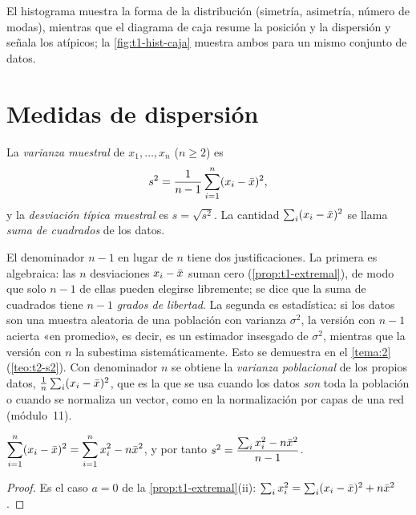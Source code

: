 El histograma muestra la forma de la distribución (simetría, asimetría, número de modas), mientras que el diagrama de caja resume la posición y la dispersión y señala los atípicos; la \cref{fig:t1-hist-caja} muestra ambos para un mismo conjunto de datos.

\section{Medidas de dispersión}

\begin{definicion}\label{def:t1-varianza}
La \emph{varianza muestral} de $x_1,\dots,x_n$ ($n\ge 2$) es
\[
s^{2}=\frac{1}{n-1}\sum_{i=1}^{n}(x_i-\bar{x})^{2},
\]
y la \emph{desviación típica muestral} es $s=\sqrt{s^{2}}$. La cantidad $\sum_i(x_i-\bar{x})^{2}$ se llama \emph{suma de cuadrados} de los datos.
\end{definicion}

\begin{observacion}\label{obs:t1-n-1}
El denominador $n-1$ en lugar de $n$ tiene dos justificaciones. La primera es algebraica: las $n$ desviaciones $x_i-\bar{x}$ suman cero (\cref{prop:t1-extremal}), de modo que solo $n-1$ de ellas pueden elegirse libremente; se dice que la suma de cuadrados tiene $n-1$ \emph{grados de libertad}. La segunda es estadística: si los datos son una muestra aleatoria de una población con varianza $\sigma^{2}$, la versión con $n-1$ acierta «en promedio», es decir, es un estimador insesgado de $\sigma^{2}$, mientras que la versión con $n$ la subestima sistemáticamente. Esto se demuestra en el \cref{tema:2} (\cref{teo:t2-s2}). Con denominador $n$ se obtiene la \emph{varianza poblacional} de los propios datos, $\frac1n\sum_i(x_i-\bar{x})^{2}$, que es la que se usa cuando los datos \emph{son} toda la población o cuando se normaliza un vector, como en la normalización por capas de una red (módulo~11).
\end{observacion}

\begin{proposicion}\label{prop:t1-abreviada}
$\displaystyle\sum_{i=1}^{n}(x_i-\bar{x})^{2}=\sum_{i=1}^{n}x_i^{2}-n\bar{x}^{2}$, y por tanto $s^{2}=\dfrac{\sum_i x_i^{2}-n\bar{x}^{2}}{n-1}$.
\end{proposicion}

\begin{proof}
Es el caso $a=0$ de la \cref{prop:t1-extremal}(ii): $\sum_i x_i^{2}=\sum_i(x_i-\bar{x})^{2}+n\bar{x}^{2}$.
\end{proof}

